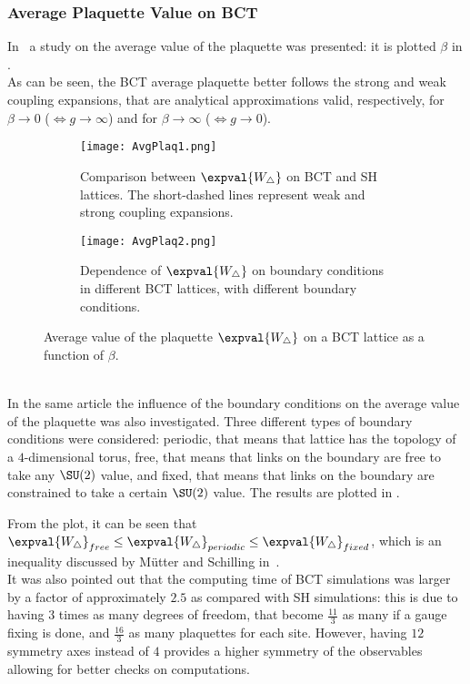 \subsubsection{Average Plaquette Value on BCT}
In~\cite{Celmaster:1983vy} a study on the average value of the plaquette was presented: it is plotted \wrt $\beta$ in .\\
As can be seen, the BCT average plaquette better follows the strong and weak coupling expansions, that are analytical approximations valid, respectively, for $\beta\to0$ ($\Leftrightarrow g\to\infty$) and for $\beta\to\infty$ ($\Leftrightarrow g\to0$).
\begin{figure}[!htbp]
    \centering
    \begin{subfigure}[b]{0.475\textwidth}
        \texttt{[image: AvgPlaq1.png]}
        \caption{Comparison between $\expval{W_\bigtriangleup}$ on BCT and SH lattices. The short-dashed lines represent weak and strong coupling expansions.}
        \label{3F:AvgPlaqBCTSH}
    \end{subfigure}
    \hfill
    \begin{subfigure}[b]{0.475\textwidth}
        \texttt{[image: AvgPlaq2.png]}
        \caption{Dependence of $\expval{W_\bigtriangleup}$ on boundary conditions in different BCT lattices, with different boundary conditions.}
        \label{3F:AvgPlaqBoundary}
    \end{subfigure}
    \caption{Average value of the plaquette $\expval{W_\bigtriangleup}$ on a BCT lattice as a function of $\beta$.}
\end{figure}\\
In the same article the influence of the boundary conditions on the average value of the plaquette was also investigated.
Three different types of boundary conditions were considered: periodic, that means that lattice has the topology of a $4$-dimensional torus, free, that means that links on the boundary are free to take any $\SU(2)$ value, and fixed, that means that links on the boundary are constrained to take a certain $\SU(2)$ value.
The results are plotted in .

From the plot, it can be seen that $\expval{W_\bigtriangleup}_{free} \leq \expval{W_\bigtriangleup}_{periodic} \leq \expval{W_\bigtriangleup}_{fixed}$, which is an inequality discussed by Mütter and Schilling in~\cite{Konig:1983dg}.\\
It was also pointed out that the computing time of BCT simulations was larger by a factor of approximately $2.5$ as compared with SH simulations: this is due to having $3$ times as many degrees of freedom, that become $\frac{11}{3}$ as many if a gauge fixing is done, and $\frac{16}{3}$ as many plaquettes for each site.
However, having $12$ symmetry axes instead of $4$ provides a higher symmetry of the observables allowing for better checks on computations.

